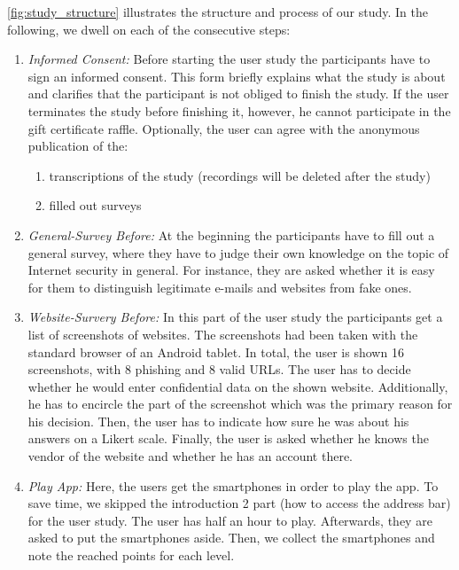 \autoref{fig:study_structure} illustrates the structure and process of our study. In the following, we dwell on each of the consecutive steps:
\begin{enumerate}
	\item \textit{Informed Consent:} Before starting the user study the participants have to sign an informed consent.
This form briefly explains what the study is about and clarifies that the participant is not obliged to finish the study.
If the user terminates the study before finishing it, however, he cannot participate in the gift certificate raffle.
Optionally, the user can agree with the anonymous publication of the:
	\begin{enumerate}
		\item transcriptions of the study (recordings will be deleted after the study)
		\item filled out surveys
	\end{enumerate}

	\item \textit{General-Survey Before:} At the beginning the participants have to fill out a general survey, where they have to judge their own knowledge on the topic of Internet security in general.
 For instance, they are asked whether it is easy for them to distinguish legitimate e-mails and websites from fake ones.

	\item \textit{Website-Survery Before:} In this part of the user study the participants get a list of screenshots of websites.
 The screenshots had been taken with the standard browser of an Android tablet.
 In total, the user is shown 16 screenshots, with 8 phishing and 8 valid URLs.
 The user has to decide whether he would enter confidential data on the shown website.
 Additionally, he has to encircle the part of the screenshot which was the primary reason for his decision.
 Then, the user has to indicate how sure he was about his answers on a Likert scale.
 Finally, the user is asked whether he knows the vendor of the website and whether he has an account there.

	\item \textit{Play App:} Here, the users get the smartphones in order to play the app.
 To save time, we skipped the introduction 2 part (how to access the address bar) for the user study.
 The user has half an hour to play.
 Afterwards, they are asked to put the smartphones aside.
 Then, we collect the smartphones and note the reached points for each level.


\end{enumerate}
